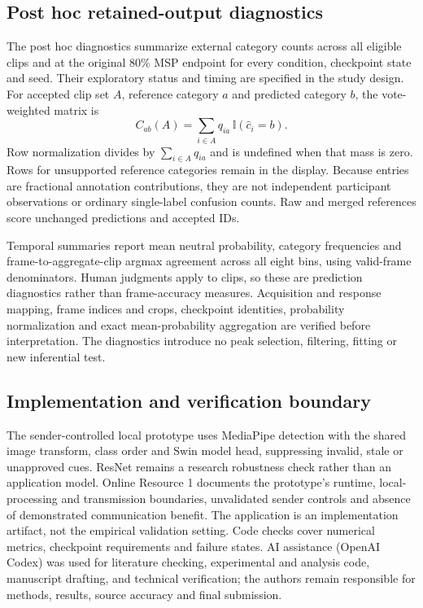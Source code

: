 \documentclass[pdflatex,sn-mathphys-num]{sn-jnl}
\begin{document}
\subsection{Post hoc retained-output diagnostics}
The post hoc diagnostics summarize external category counts across all eligible clips and at the original 80\% MSP endpoint for every condition, checkpoint state and seed. Their exploratory status and timing are specified in the study design. For accepted clip set $A$, reference category $a$ and predicted category $b$, the vote-weighted matrix is
\begin{equation}
C_{ab}(A)=\sum_{i\in A}q_{ia}\,\mathbb{I}(\hat c_i=b).
\end{equation}
Row normalization divides by $\sum_{i\in A}q_{ia}$ and is undefined when that mass is zero. Rows for unsupported reference categories remain in the display. Because entries are fractional annotation contributions, they are not independent participant observations or ordinary single-label confusion counts. Raw and merged references score unchanged predictions and accepted IDs.

Temporal summaries report mean neutral probability, category frequencies and frame-to-aggregate-clip argmax agreement across all eight bins, using valid-frame denominators. Human judgments apply to clips, so these are prediction diagnostics rather than frame-accuracy measures. Acquisition and response mapping, frame indices and crops, checkpoint identities, probability normalization and exact mean-probability aggregation are verified before interpretation. The diagnostics introduce no peak selection, filtering, fitting or new inferential test.

\subsection{Implementation and verification boundary}
The sender-controlled local prototype uses MediaPipe detection \cite{lugaresi2019mediapipe} with the shared image transform, class order and Swin model head, suppressing invalid, stale or unapproved cues. ResNet remains a research robustness check rather than an application model. Online Resource 1 documents the prototype's runtime, local-processing and transmission boundaries, unvalidated sender controls and absence of demonstrated communication benefit. The application is an implementation artifact, not the empirical validation setting. Code checks cover numerical metrics, checkpoint requirements and failure states. AI assistance (OpenAI Codex) was used for literature checking, experimental and analysis code, manuscript drafting, and technical verification; the authors remain responsible for methods, results, source accuracy and final submission.
\end{document}
